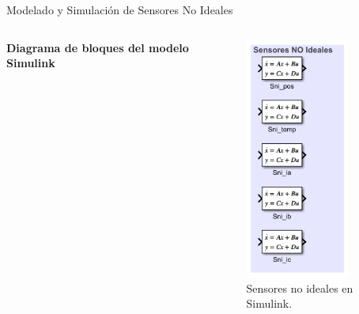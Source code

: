 \documentclass[12pt]{beamer}
\begin{document}
\begin{frame}{Modelado y Simulación de Sensores No Ideales}
    \begin{columns}
        \textbf{Diagrama de bloques del modelo Simulink}
        \begin{figure}
            \centering
            \includegraphics[width=0.8\textwidth]{Imagenes/sensores_no_ideales.png}
            \caption{Sensores no ideales en Simulink.}
        \end{figure}


\end{columns}
\end{frame}
\end{document}
